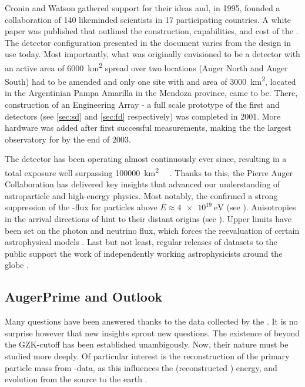 Cronin and Watson gathered support for their ideas and, in 1995, founded a 
collaboration of 140 likeminded scientists in 17 participating countries. A 
white paper was published that outlined the construction, capabilities, and 
cost of the \PAO \cite{thepierreaugercollaborationPierreAugerObservatory1997}. 
The detector configuration presented in the document varies from the design in 
use today. Most importantly, what was originally envisioned to be a detector 
with an active area of \SI{6000}{\km\squared} spread over two locations (Auger 
North and Auger South) had to be amended and only one site with and area of 
\SI{3000}{\km\squared}, located in the Argentinian Pampa Amarilla in the Mendoza
province, came to be. There, construction of an Engineering Array - a full scale
prototype of the first \SD and \FD detectors (see \cref{sec:sd} and 
\cref{sec:fd} respectively) was completed in 2001. More hardware was added after
first successful measurements, making the \PAO the largest observatory for \CRs 
by the end of 2003.

The detector has been operating almost continuously ever since, resulting in a 
total exposure well surpassing \SI{100000}{\km\squared\sr\year} 
\cite{aabPierreAugerObservatory2020}. Thanks to this, the Pierre Auger 
Collaboration has delivered key insights that advanced our understanding of 
astroparticle and high-energy physics. Most notably, the \PAO confirmed a 
strong suppression of the \CR-flux for particles above 
$E\approx\SI{4e19}{\eV}$ \cite{yamamotoUHECRSpectrumMeasured2007} (see 
). Anisotropies in the arrival directions of \UHECRs 
hint to their distant origins
\cite{thepierreaugercollaborationObservationLargescaleAnisotropy2017} (see 
). Upper limits have been set on the \UHE photon and
neutrino flux, which forces the reevaluation of certain astrophysical models 
\cite{collaborationPierreAugerObservatory2011, abreuSearchUltrahighEnergy2011}.
Last but not least, regular releases of datasets to the public support the work 
of independently working astrophysicists around the globe 
\cite{pierreaugercollaborationPierreAugerObservatory2025}.

\subsection{AugerPrime and Outlook}
\label{ssec:augerprime-and-outlook}

Many questions have been answered thanks to the data collected by the \PAO. It
is no surprise however that new insights sprout new questions. The existence of 
\UHECRs beyond the GZK-cutoff has been established unambigously. Now, their
nature must be studied more deeply. Of particular interest is the reconstruction
of the primary particle mass from \EAS-data, as this influences the \CRs
(reconstructed \cite{yushkovMassCompositionCosmic2021}) energy, and evolution 
from the source to the earth \cite{strongCosmicRayPropagationInteractions2007, 
flaggsStudyingMassSensitivity2024}.

